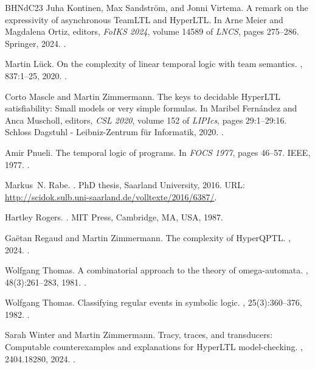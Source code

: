 \documentclass[dvipsnames,10pt,a4paper]{amsart}
\theoremstyle{definition}
\theoremstyle{remark}
\begin{document}
\begin{thebibliography}{BHNdC23}
Juha Kontinen, Max Sandstr{\"{o}}m, and Jonni Virtema.
\newblock A remark on the expressivity of asynchronous {TeamLTL} and {HyperLTL}.
\newblock In Arne Meier and Magdalena Ortiz, editors, {\em FoIKS 2024}, volume 14589 of {\em LNCS}, pages 275--286. Springer, 2024.
\newblock \href {https://doi.org/10.1007/978-3-031-56940-1\_15} {}.

Martin L{\"{u}}ck.
\newblock On the complexity of linear temporal logic with team semantics.
, 837:1--25, 2020.
\newblock \href {https://doi.org/10.1016/j.tcs.2020.04.019} {}.

Corto Mascle and Martin Zimmermann.
\newblock The keys to decidable {HyperLTL} satisfiability: Small models or very simple formulas.
\newblock In Maribel Fern{\'{a}}ndez and Anca Muscholl, editors, {\em {CSL} 2020}, volume 152 of {\em LIPIcs}, pages 29:1--29:16. Schloss Dagstuhl - Leibniz-Zentrum für Informatik, 2020.
\newblock \href {https://doi.org/10.4230/LIPIcs.CSL.2020.29} {}.

Amir Pnueli.
\newblock The temporal logic of programs.
\newblock In {\em FOCS 1977}, pages 46--57. IEEE, 1977.
\newblock \href {https://doi.org/10.1109/SFCS.1977.32} {}.

Markus~N. Rabe.
.
\newblock PhD thesis, Saarland University, 2016.
\newblock URL: \url{http://scidok.sulb.uni-saarland.de/volltexte/2016/6387/}.

Hartley Rogers.
.
\newblock MIT Press, Cambridge, MA, USA, 1987.

Gaëtan Regaud and Martin Zimmermann.
\newblock The complexity of {HyperQPTL}.
, 2024.
\newblock \href {https://doi.org/10.48550/ARXIV.2412.07341} {}.

Wolfgang Thomas.
\newblock A combinatorial approach to the theory of omega-automata.
, 48(3):261--283, 1981.
\newblock \href {https://doi.org/10.1016/S0019-9958(81)90663-X} {}.

Wolfgang Thomas.
\newblock Classifying regular events in symbolic logic.
, 25(3):360--376, 1982.
\newblock \href {https://doi.org/10.1016/0022-0000(82)90016-2} {}.

Sarah Winter and Martin Zimmermann.
\newblock Tracy, traces, and transducers: Computable counterexamples and explanations for {HyperLTL} model-checking.
, 2404.18280, 2024.
\newblock \href {https://doi.org/10.48550/ARXIV.2404.18280} {}.

\end{thebibliography}
\end{document}
